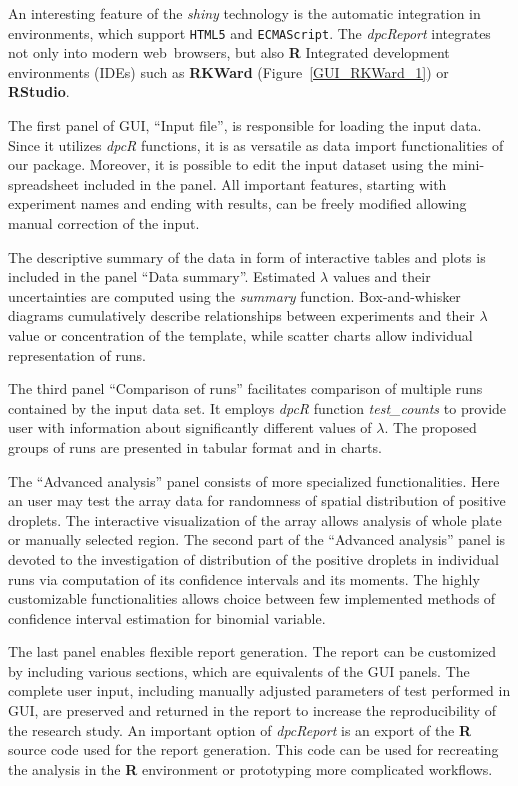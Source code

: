 \documentclass[a4,center,fleqn]{NAR}
\begin{document}
An interesting feature of the \textit{shiny} technology is the automatic 
integration in environments, which support \texttt{HTML5} and 
\texttt{ECMAScript}. The \textit{dpcReport} integrates not only into modern 
web~browsers, but also \textbf{R} Integrated development environments (IDEs) 
such as \textbf{RKWard} (Figure~\ref{GUI_RKWard_1}) \cite{rodiger_rkward_2012} 
or \textbf{RStudio}.

The first panel of GUI, ``Input file'', is responsible for loading the input 
data. Since it utilizes \textit{dpcR} functions, it is as versatile as data 
import functionalities of our package. Moreover, it is possible to edit the 
input dataset using the mini-spreadsheet included in the panel. All important 
features, starting with experiment names and ending with results, can be freely 
modified allowing manual correction of the input.

The descriptive summary of the data in form of interactive tables and plots is 
included in the panel ``Data summary''. Estimated $\lambda$ values and their 
uncertainties are computed using the \textit{summary} function. Box-and-whisker 
diagrams cumulatively describe relationships between experiments and their 
$\lambda$ value or concentration of the template, while scatter charts allow 
individual representation of runs.

The third panel ``Comparison of runs'' facilitates comparison of multiple runs 
contained by the input data set. It employs \textit{dpcR} function 
\textit{test\_counts} to provide user with information about significantly 
different values of $\lambda$. The proposed groups of runs are presented in 
tabular format and in charts.

The ``Advanced analysis'' panel consists of more specialized 
functionalities. Here an user may test the array data for randomness of 
spatial distribution of positive droplets. The interactive visualization of the 
array allows analysis of whole plate or manually selected region. The second 
part of the ``Advanced analysis'' panel is devoted to the investigation of 
distribution of the positive droplets in individual runs via computation of 
its confidence intervals and its moments. The highly customizable 
functionalities allows choice between few implemented methods of confidence 
interval estimation for binomial variable.

The last panel enables flexible report generation. The report can be customized 
by including various sections, which are equivalents of the GUI panels. The 
complete user input, including manually adjusted parameters of test performed in 
GUI, are preserved and returned in the report to increase the reproducibility of 
the research study. An important option of \textit{dpcReport} is an export of 
the \textbf{R} source code used for the report generation. This code can be used 
for recreating the analysis in the \textbf{R} environment or prototyping more 
complicated workflows.
\end{document}

